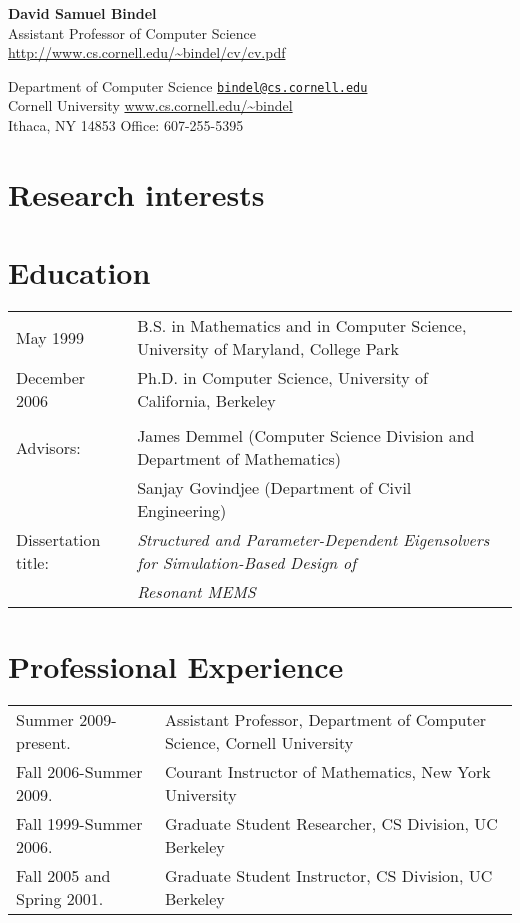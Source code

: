 \documentclass{article}
\begin{document}
\begin{center}
  {\Large \bf David Samuel Bindel} \\
  Assistant Professor of Computer Science \\
  \url{http://www.cs.cornell.edu/~bindel/cv/cv.pdf}
\end{center}

\begin{trivlist}
\item
Department of Computer Science
  \hfill \href{mail:bindel@cs.cornell.edu}{\tt bindel@cs.cornell.edu} \\
Cornell University
  \hfill \url{www.cs.cornell.edu/~bindel} \\
Ithaca, NY 14853
  \hfill Office: 607-255-5395
\end{trivlist}


\section*{Research interests}



\section*{Education}

\begin{tabular}{ll}
May 1999 &
  B.S. in Mathematics and in Computer Science,
  University of Maryland, College Park \\
December 2006 &
  Ph.D. in Computer Science, University of California, Berkeley
\\
\\
Advisors:
 & James Demmel (Computer Science Division and Department of Mathematics) \\
 & Sanjay Govindjee (Department of Civil Engineering) \\
Dissertation title: &
   {\em Structured and Parameter-Dependent Eigensolvers for
        Simulation-Based Design of} \\
&  {\em Resonant MEMS}
\end{tabular}


\section*{Professional Experience}

\begin{tabular}{ll}
  Summer 2009-present.
    & Assistant Professor, Department of Computer Science,
      Cornell University \\
  Fall 2006-Summer 2009.
    & Courant Instructor of Mathematics, New York University \\
  Fall 1999-Summer 2006.
    & Graduate Student Researcher, CS Division, UC Berkeley \\
  Fall 2005 and Spring 2001.
    & Graduate Student Instructor, CS Division, UC Berkeley
\end{tabular}
\end{document}

